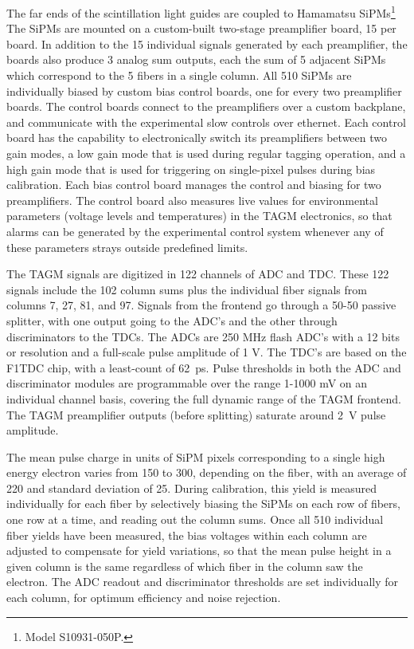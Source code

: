 The far ends of the scintillation light guides are coupled to Hamamatsu SiPMs\footnote{Model S10931-050P.} The SiPMs are mounted on a custom-built two-stage preamplifier board, 15 per board. In addition to the 15 individual signals generated
by each preamplifier, the boards also produce 3 analog sum outputs, each the sum
of 5 adjacent SiPMs which correspond to the 5 fibers in a single column. All 510
SiPMs are individually biased by custom bias control boards, one for every two
preamplifier boards. The control boards connect to the
preamplifiers over a custom backplane, and communicate with the
experimental slow controls over ethernet. Each control board has the
capability to electronically switch its preamplifiers between two gain modes,
a low gain mode that is used during regular tagging operation, and a high gain
mode that is used for triggering on single-pixel pulses during bias calibration.
Each bias control board manages the control and biasing for two preamplifiers.
The control board also measures live values for environmental parameters
(voltage levels and temperatures) in the TAGM electronics, so that alarms can
be generated by the experimental control system whenever any of these parameters
strays outside predefined limits.

The TAGM signals are digitized in 122 channels of ADC and TDC. These 122
signals include the 102 column sums plus the individual fiber signals from
columns 7, 27, 81, and 97. Signals from the frontend go through a 50-50
passive splitter, with one output going to the ADC's and the other through
discriminators to the TDCs. The ADCs are 250 MHz flash ADC's with a 12 bits
or resolution and a full-scale pulse amplitude of 1 V. The TDC's are based
on the F1TDC chip, with a least-count of 62~ps. Pulse thresholds in both
the ADC and discriminator modules are programmable over the range 1-1000 mV
on an individual channel basis, covering the full dynamic range of the TAGM
frontend. The TAGM preamplifier outputs (before splitting) saturate around
2~V pulse amplitude.

The mean pulse charge in units of SiPM pixels corresponding to a
single high energy electron varies from 150 to 300, depending on the fiber,
with an average of 220 and standard deviation of 25. During calibration,
this yield is measured individually for each fiber by selectively biasing
the SiPMs on each row of fibers, one row at a time, and reading out the column
sums. Once all 510 individual fiber yields have been measured, the bias voltages
within each column are adjusted to compensate for yield variations, so
that the mean pulse height in a given column is the same regardless of which
fiber in the column saw the electron. The ADC readout and discriminator
thresholds are set individually for each column, for optimum efficiency and
noise rejection.

